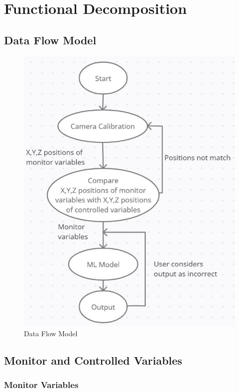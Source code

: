 \documentclass[12pt]{article}
\begin{document}
\section{Functional Decomposition}
\subsection{Data Flow Model}

\begin{figure}[H] 
\centering
\includegraphics[width=\textwidth,height=0.8\textheight,keepaspectratio]{Data Flow.JPG} 
\caption{Data Flow Model} 
\label{Fig.Data_Flow} 
\end{figure}

\newpage
\subsection{Monitor and Controlled Variables}
\subsubsection{Monitor Variables}
\end{document}
